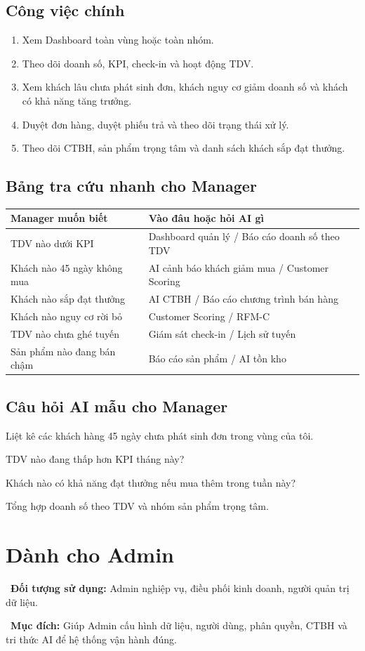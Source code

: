 \documentclass[12pt,a4paper,oneside,openany]{book}
\newcommand{\screenpurpose}[1]{\begin{tcolorbox}[colback=medgreen!8,colframe=medgreen!55,left=6pt,right=6pt,top=4pt,bottom=4pt]\faFlag\ \textbf{Mục đích:} #1\end{tcolorbox}}
\newcommand{\screenuser}[1]{\noindent\faUsers\ \textbf{Đối tượng sử dụng:} #1\par\smallskip}
\newcommand{\prompt}[1]{\begin{tcolorbox}[codeBox]#1\end{tcolorbox}}
\begin{document}
\section{Công việc chính}
\begin{enumerate}
  \item Xem Dashboard toàn vùng hoặc toàn nhóm.
  \item Theo dõi doanh số, KPI, check-in và hoạt động TDV.
  \item Xem khách lâu chưa phát sinh đơn, khách nguy cơ giảm doanh số và khách có khả năng tăng trưởng.
  \item Duyệt đơn hàng, duyệt phiếu trả và theo dõi trạng thái xử lý.
  \item Theo dõi CTBH, sản phẩm trọng tâm và danh sách khách sắp đạt thưởng.
\end{enumerate}

\section{Bảng tra cứu nhanh cho Manager}
\begin{longtable}{p{6cm}p{8cm}}
\toprule
\textbf{Manager muốn biết} & \textbf{Vào đâu hoặc hỏi AI gì} \\
\midrule
TDV nào dưới KPI & Dashboard quản lý / Báo cáo doanh số theo TDV \\
Khách nào 45 ngày không mua & AI cảnh báo khách giảm mua / Customer Scoring \\
Khách nào sắp đạt thưởng & AI CTBH / Báo cáo chương trình bán hàng \\
Khách nào nguy cơ rời bỏ & Customer Scoring / RFM-C \\
TDV nào chưa ghé tuyến & Giám sát check-in / Lịch sử tuyến \\
Sản phẩm nào đang bán chậm & Báo cáo sản phẩm / AI tồn kho \\
\bottomrule
\end{longtable}

\section{Câu hỏi AI mẫu cho Manager}
\prompt{Liệt kê các khách hàng 45 ngày chưa phát sinh đơn trong vùng của tôi.}
\prompt{TDV nào đang thấp hơn KPI tháng này?}
\prompt{Khách nào có khả năng đạt thưởng nếu mua thêm trong tuần này?}
\prompt{Tổng hợp doanh số theo TDV và nhóm sản phẩm trọng tâm.}

\chapter{Dành cho Admin}
\screenuser{Admin nghiệp vụ, điều phối kinh doanh, người quản trị dữ liệu.}
\screenpurpose{Giúp Admin cấu hình dữ liệu, người dùng, phân quyền, CTBH và tri thức AI để hệ thống vận hành đúng.}
\end{document}
